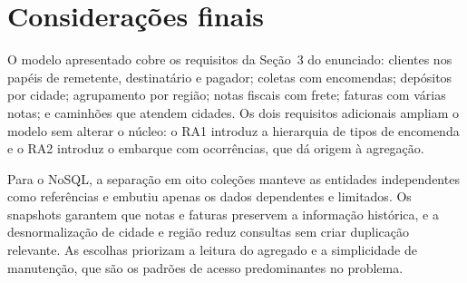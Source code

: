\section{Considerações finais}

O modelo apresentado cobre os requisitos da Seção~3 do enunciado: clientes nos papéis de remetente, destinatário e pagador; coletas com encomendas; depósitos por cidade; agrupamento por região; notas fiscais com frete; faturas com várias notas; e caminhões que atendem cidades. Os dois requisitos adicionais ampliam o modelo sem alterar o núcleo: o RA1 introduz a hierarquia de tipos de encomenda e o RA2 introduz o embarque com ocorrências, que dá origem à agregação.

Para o NoSQL, a separação em oito coleções manteve as entidades independentes como referências e embutiu apenas os dados dependentes e limitados. Os snapshots garantem que notas e faturas preservem a informação histórica, e a desnormalização de cidade e região reduz consultas sem criar duplicação relevante. As escolhas priorizam a leitura do agregado e a simplicidade de manutenção, que são os padrões de acesso predominantes no problema.
